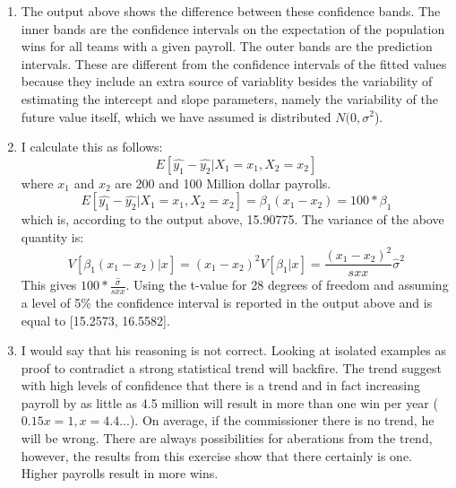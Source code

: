 \documentclass{article}
\begin{document}
\begin{enumerate}
\item The output above shows the difference between these confidence bands. The inner bands are the confidence intervals on the expectation of the population wins for all teams with a given payroll. The outer bands are the prediction intervals. These are different from the confidence intervals of the fitted values because they include an extra source of variablity besides the variability of estimating the intercept and slope parameters, namely the variability of the future value itself, which we have assumed is distributed $N(0,\sigma^2$). 
\item I calculate this as follows:
$$ E[\hat{y_1} - \hat{y_2}|X_1=x_1, X_2=x_2] $$ where $ x_1 $ and $ x_2 $ are 200 and 100 Million dollar payrolls. 
$$ E[\hat{y_1} - \hat{y_2}|X_1=x_1, X_2=x_2] = \beta_1 (x_1-x_2) = 100 * \beta_1 $$
which is, according to the output above, 15.90775. 
The variance of the above quantity is:
$$ V[\beta_1 ( x_1 - x_2)|x] = (x_1 - x_2) ^2 V[\beta_1|x] = \frac{(x_1 - x_2)^2}{sxx}\hat{\sigma}^2 $$
This gives $ 100 * \frac{\hat{\sigma}}{sxx} $. Using the t-value for 28 degrees of freedom and assuming a level of 5\% the confidence interval is reported in the output above and is equal to [15.2573, 16.5582]. 
\item I would say that his reasoning is not correct. Looking at isolated examples as proof to contradict a strong statistical trend will backfire. The trend suggest with high levels of confidence that there is a trend and in fact increasing payroll by as little as 4.5 million will result in more than one win per year ($ 0.15x = 1, x = 4.4...$). On average, if the commissioner there is no trend, he will be wrong. There are always possibilities for aberations from the trend, however, the results from this exercise show that there certainly is one. Higher payrolls result in more wins. 
\end{enumerate}
\end{document}
